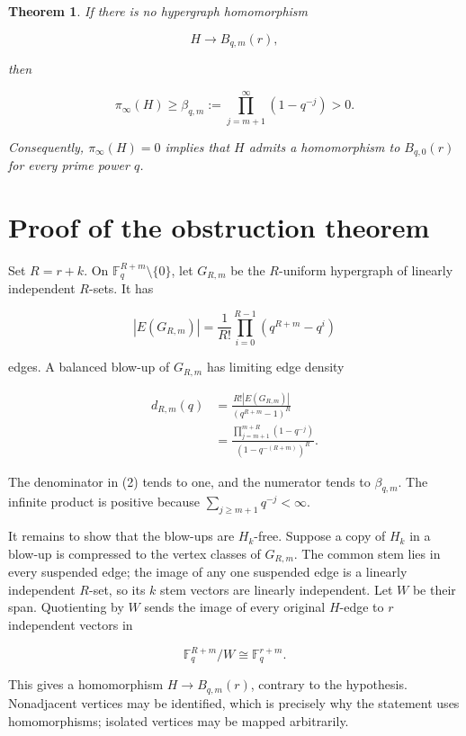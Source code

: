 \documentclass[11pt]{article}
\newtheorem{theorem}{Theorem}
\numberwithin{equation}{section}
\begin{document}
\begin{theorem}


If there is no hypergraph homomorphism

\[
H\longrightarrow B_{q,m}(r),
\]

then

\[
\pi_\infty(H)\geq\beta_{q,m}:=
\prod_{j=m+1}^{\infty}(1-q^{-j})>0.
\tag{1}
\]

Consequently, $\pi_\infty(H)=0$ implies that $H$ admits a homomorphism to $B_{q,0}(r)$ for every
prime power $q$.

\end{theorem}

\section{Proof of the obstruction theorem}


Set $R=r+k$. On $\mathbb F_q^{R+m}\setminus\{0\}$, let $G_{R,m}$ be the $R$-uniform
hypergraph of linearly independent $R$-sets. It has

\[
|E(G_{R,m})|=\frac1{R!}\prod_{i=0}^{R-1}(q^{R+m}-q^i)
\]

edges. A balanced blow-up of $G_{R,m}$ has limiting edge density

\[
\begin{aligned}
d_{R,m}(q)
&=\frac{R!|E(G_{R,m})|}{(q^{R+m}-1)^R}\\
&=\frac{\prod_{j=m+1}^{m+R}(1-q^{-j})}
{(1-q^{-(R+m)})^R}.
\end{aligned}
\tag{2}
\]

The denominator in (2) tends to one, and the numerator tends to $\beta_{q,m}$. The infinite
product is positive because $\sum_{j\geq m+1}q^{-j}<\infty$.

It remains to show that the blow-ups are $H_k$-free. Suppose a copy of $H_k$ in a blow-up is
compressed to the vertex classes of $G_{R,m}$. The common stem lies in every suspended edge; the
image of any one suspended edge is a linearly independent $R$-set, so its $k$ stem vectors are
linearly independent. Let $W$ be their span. Quotienting by $W$ sends the image of every original
$H$-edge to $r$ independent vectors in

\[
\mathbb F_q^{R+m}/W\cong\mathbb F_q^{r+m}.
\]

This gives a homomorphism $H\to B_{q,m}(r)$, contrary to the hypothesis. Nonadjacent vertices may
be identified, which is precisely why the statement uses homomorphisms; isolated vertices may be
mapped arbitrarily.
\end{document}
